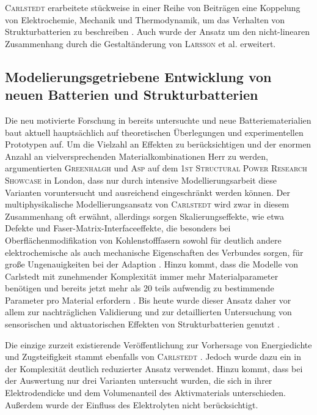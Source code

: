 \textsc{Carlstedt} erarbeitete stückweise in einer Reihe von Beiträgen eine Koppelung von Elektrochemie, Mechanik und Thermodynamik, um das Verhalten von Strukturbatterien zu beschreiben \cite{Carlstedt2019,Carlstedt2019a,Carlstedt2019b,Carlstedt2020,Carlstedt2020b,Carlstedt2022,Carlstedt2022a,Carlstedt2022b}. Auch wurde der Ansatz um den nicht-linearen Zusammenhang durch die Gestaltänderung von \textsc{Larsson} et al. \cite{Larsson2023} erweitert.

\subsection*{Modelierungsgetriebene Entwicklung von neuen Batterien und Strukturbatterien}

Die neu motivierte Forschung in bereits untersuchte und neue Batteriematerialien baut aktuell hauptsächlich auf theoretischen Überlegungen und experimentellen Prototypen auf. Um die Vielzahl an Effekten zu berücksichtigen und der enormen Anzahl an vielversprechenden Materialkombinationen Herr zu werden, argumentierten \textsc{Greenhalgh} \cite{Greenhalgh2024,Greenhalgh2024a} und \textsc{Asp} \cite{Asp2024} auf dem \textsc{1st Structural Power Research Showcase} in London, dass nur durch intensive Modellierungsarbeit diese Varianten voruntersucht und ausreichend eingeschränkt werden können. Der multiphysikalische Modellierungsansatz von \textsc{Carlstedt} wird zwar in diesem Zusammenhang oft erwähnt, allerdings sorgen Skalierungseffekte, wie etwa Defekte und Faser-Matrix-Interfaceeffekte, die besonders bei Oberflächenmodifikation von Kohlenstofffasern sowohl für deutlich andere elektrochemische als auch mechanische Eigenschaften des Verbundes sorgen, für große Ungenauigkeiten bei der Adaption \cite{Franco2019,Fam2024}. Hinzu kommt, dass die Modelle von Carlstedt mit zunehmender Komplexität immer mehr Materialparameter benötigen und bereits jetzt mehr als 20 teils aufwendig zu bestimmende Parameter pro Material erfordern \cite{Greenhalgh2024a}. Bis heute wurde dieser Ansatz daher vor allem zur nachträglichen Validierung und zur detaillierten Untersuchung von sensorischen und aktuatorischen Effekten von Strukturbatterien genutzt \cite{Carlstedt2023}.

Die einzige zurzeit existierende Veröffentlichung zur Vorhersage von Energiedichte und Zugsteifigkeit stammt ebenfalls von \textsc{Carlstedt} \cite{Carlstedt2018}. Jedoch wurde dazu ein in der Komplexität deutlich reduzierter Ansatz verwendet. Hinzu kommt, dass bei der Auswertung nur drei Varianten untersucht wurden, die sich in ihrer Elektrodendicke und dem Volumenanteil des Aktivmaterials unterschieden. Außerdem wurde der Einfluss des Elektrolyten nicht berücksichtigt.



